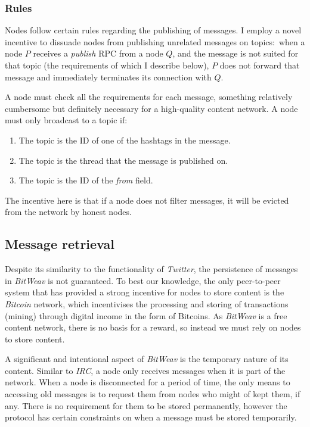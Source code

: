 \documentclass[10pt,a4paper,onecolumn]{article}
\begin{document}
\subsubsection*{Rules}
Nodes follow certain rules regarding the publishing of messages. I employ a novel incentive to dissuade nodes from publishing unrelated messages on topics:~when a node $P$ receives a \emph{publish} RPC from a node $Q$, and the message is not suited for that topic (the requirements of which I describe below), $P$ does not forward that message and immediately terminates its connection with $Q$.  

A node must check all the requirements for each message, something relatively cumbersome but definitely necessary for a high-quality content network. A node must only broadcast to a topic if:
\begin{enumerate}
\item The topic is the ID of one of the hashtags in the message.
\item The topic is the thread that the message is published on.
\item The topic is the ID of the \emph{from} field. 
\end{enumerate}

The incentive here is that if a node does not filter messages, it will be evicted from the network by honest nodes.

\subsection{Message retrieval}
Despite its similarity to the functionality of \textit{Twitter}, the persistence of messages in \textit{BitWeav} is not guaranteed. To best our knowledge, the only peer-to-peer system that has provided a strong incentive for nodes to store content is the \textit{Bitcoin} network, which incentivises the processing and storing of transactions (mining) through digital income in the form of Bitcoins. As \textit{BitWeav} is a free content network, there is no basis for a reward, so instead we must rely on nodes to store content.

A significant and intentional aspect of \textit{BitWeav} is the temporary nature of its content. Similar to \textit{IRC}, a node only receives messages when it is part of the network. When a node is disconnected for a period of time, the only means to accessing old messages is to request them from nodes who might of kept them, if any. There is no requirement for them to be stored permanently, however the protocol has certain constraints on when a message must be stored temporarily.
\end{document}
